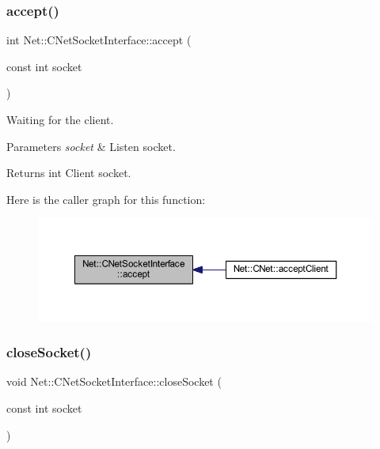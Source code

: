 \subsubsection{\texorpdfstring{accept()}{accept()}}
{\footnotesize\ttfamily int Net\+::\+C\+Net\+Socket\+Interface\+::accept (\begin{DoxyParamCaption}\item[{const int}]{socket }\end{DoxyParamCaption})\hspace{0.3cm}{\ttfamily [static]}}



Waiting for the client. 


\begin{DoxyParams}{Parameters}
{\em socket} & Listen socket. \\
\hline
\end{DoxyParams}
\begin{DoxyReturn}{Returns}
int Client socket. 
\end{DoxyReturn}
Here is the caller graph for this function\+:
\nopagebreak
\begin{figure}[H]
\begin{center}
\leavevmode
\includegraphics[width=350pt]{class_net_1_1_c_net_socket_interface_a4fceb3945002b0aa62dbc7af4afac76d_icgraph}
\end{center}
\end{figure}
\mbox{\label{class_net_1_1_c_net_socket_interface_a32974d8d814e78f05208eec685376df5}} 
\subsubsection{\texorpdfstring{close\+Socket()}{closeSocket()}}
{\footnotesize\ttfamily void Net\+::\+C\+Net\+Socket\+Interface\+::close\+Socket (\begin{DoxyParamCaption}\item[{const int}]{socket }\end{DoxyParamCaption})\hspace{0.3cm}{\ttfamily [static]}}



